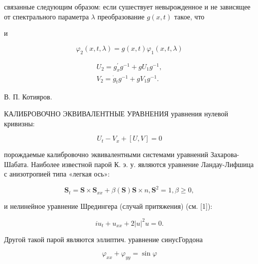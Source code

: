 \documentclass[10pt]{article}
\begin{document}
связанные следующим образом: если сушествует невырожденное и не зависящее от спектрального параметра $\lambda$ преобразование $g(x, t)$ такое, что



и



\[

\varphi_{2}(x, t, \lambda)=g(x, t) \varphi_{1}(x, t, \lambda)

\]



\[

\begin{gathered}

U_{2}=g_{x}^{\prime} g^{-1}+g U_{1} g^{-1}, \\

V_{2}=\dot{g}_{t} g^{-1}+g V_{1} g^{-1} .

\end{gathered}

\]



В. П. Котияров.



КАЛИБРОВОЧНО ЭКВИВАЛЕНТНЫЕ УРАВНЕНИЯ уравнения нулевой кривизны:



\[

U_{t}-V_{x}+[U, V]=0

\]



порождаемые калибровочно эквивалентными системами уравнений Захарова-Шабата. Наиболее известной парой К. э. у. являются уравнение Ландау-Лифшица с анизотропией типа «легкая ось»:



\[

\boldsymbol{S}_{t}=\boldsymbol{S} \times \boldsymbol{S}_{x x}+\beta(\boldsymbol{S}) \boldsymbol{S} \times n, \boldsymbol{S}^{2}=1, \beta \geqslant 0,

\]



и нелинейное уравнение Шредингера (случай притяжения) (см. [1]):



\[

i u_{t}+u_{x x}+2|u|^{2} u=0 .

\]



Другой такой парой являются эллиптич. уравнение синусГордона



\[

\varphi_{x x}+\varphi_{y y}=\sin \varphi

\]
\end{document}
